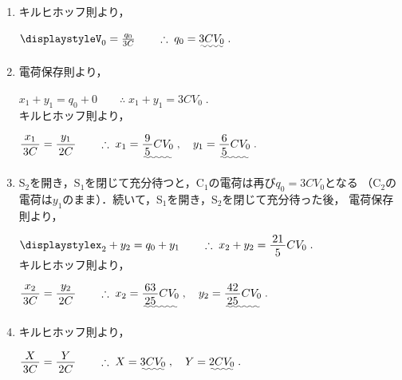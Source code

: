 \documentclass[../../../uem_phy_std_a.tex]{subfiles}
\begin{document}
    \begin{enumerate}
        \item キルヒホッフ則より，
            
            \myspaceb%
            $\displaystyle%
                V_0 = \frac{q_0}{3C} \qquad \therefore \; q_0 = \uwave{3CV_0} \;.
            $
        \item 電荷保存則より，
            
            \myspaceb%
            $\displaystyle%
                x_1 + y_1 = q_0 + 0 \qquad \therefore \; x_1 + y_1 = 3CV_0 \;.
            $\\            
            キルヒホッフ則より，
            
            \myspaceb%
            $\displaystyle%
                \myfracc{x_1}{3C} = \myfracc{y_1}{2C}%
                \qquad \therefore \; x_1 = \uwave{\myfraca{9}{5} CV_0} \;,%
                \quad y_1 = \uwave{\myfraca{6}{5} CV_0} \;.
            $
        \item S$_2$を開き，S$_1$を閉じて充分待つと，C$_1$の電荷は再び$q_0=3CV_0$となる%
            （C$_2$の電荷は$y_1$のまま）．続いて，S$_1$を開き，S$_2$を閉じて充分待った後，%
            電荷保存則より，
            
            \myspaceb%
            $\displaystyle%
                x_2 + y_2 = q_0 + y_1 \qquad \therefore \; x_2 + y_2 = \myfraca{21}{5}CV_0 \;.
            $\\
            キルヒホッフ則より，
            
            \myspaceb%
            $\displaystyle%
                \myfracc{x_2}{3C} = \myfracc{y_2}{2C}%
                \qquad \therefore \; x_2 = \uwave{\myfraca{63}{25} CV_0} \;,%
                \quad y_2 = \uwave{\myfraca{42}{25} CV_0} \;.
            $
        \item キルヒホッフ則より，
            
            \myspaceb%
            $\displaystyle%
                \myfraca{X}{3C} = \myfraca{Y}{2C}%
                \qquad \therefore \; X = \uwave{3CV_0} \;,%
                \quad Y = \uwave{2CV_0} \;.
            $
    \end{enumerate}
\end{document}

